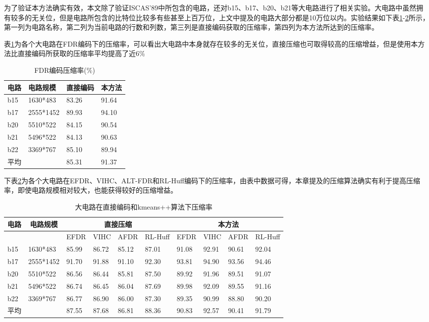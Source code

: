 为了验证本方法确实有效，本文除了验证ISCAS’89中所包含的电路，还对b15、b17、b20、b21等大电路进行了相关实验。大电路中虽然拥有较多的无关位，但是电路所包含的比特位比较多有些甚至上百万位，上文中提及的电路大部分都是10万位以内。实验结果如下表\ref{ptabl8}-\ref{ptabl9}所示，第一列为电路名称，第二列为当前电路的行数和列数，第三列是直接编码获取的压缩率，第四列为本方法所达到的压缩率。

表\ref{ptabl8}为各个大电路在FDR编码下的压缩率，可以看出大电路中本身就存在较多的无关位，直接压缩也可取得较高的压缩增益，但是使用本方法比直接编码所获取的压缩率平均提高了近6\%

\begin{table}[H]
\centering
\caption{FDR编码压缩率(\%)}\label{ptabl8}
\begin{tabular}{p{2.2cm}<{\centering}p{5cm}<{\centering}p{3cm}<{\centering}p{3cm}<{\centering}}
\toprule
\textbf{电路}&	\textbf{电路规模}& \textbf{直接编码}& \textbf{本方法}\\
\midrule
b15& 1630*483&	83.26&	91.64\\
b17& 2555*1452&	89.93&	94.10\\
b20& 5510*522&	84.15&	90.54\\
b21& 5496*522&	84.13&	90.63\\
b22& 3369*767&	85.10&	89.94\\
平均&	&   85.31&  91.37\\
\bottomrule
\end{tabular}
\end{table}

下表\ref{ptabl9}为各个大电路在EFDR、VIHC、ALT-FDR和RL-Huff编码下的压缩率，由表中数据可得，本章提及的压缩算法确实有利于提高压缩率，即使电路规模相对较大，也能获得较好的压缩增益。

\begin{table}[H]
\centering
\caption{大电路在直接编码和kmeans++算法下压缩率}\label{ptabl9}
\begin{tabular}{p{1cm}p{1cm}<{\centering}p{1.2cm}<{\centering}p{1.2cm}<{\centering}
p{1.2cm}<{\centering}p{1.2cm}<{\centering}p{1.2cm}<{\centering}p{1.2cm}<{\centering}
p{1.2cm}<{\centering}p{1.2cm}<{\centering}}
\toprule
\multicolumn{1}{c}{\textbf{电路}}& \multicolumn{1}{c}{\textbf{电路规模}} &
\multicolumn{4}{c}{\textbf{直接压缩}} & \multicolumn{4}{c}{\textbf{本方法}} \\
\midrule
&  & EFDR&   VIHC&    AFDR&   RL-Huff& 	EFDR&    VIHC&    AFDR&   RL-Huff\\
\hline
b15& 1630*483&	85.99&	86.72&	85.12&	87.01&	91.08&	92.91&	90.61&	92.04\\
b17& 2555*1452&	91.70&	91.88&	91.10&	92.30&	93.81&	94.90&	93.56&	94.46\\
b20& 5510*522&	86.56&	86.44&	85.81&	87.50&	89.92&	91.96&	89.51&	91.07\\
b21& 5496*522&	86.74&	86.45&	86.04&	87.69&	89.98&	92.09&	89.55&	91.16\\
b22& 3369*767&	86.77&	86.90&	86.00&	87.30&	89.35&	90.99&	88.80&	90.20\\
平均&		 &  87.55&	87.68&	86.81&	88.36&	90.83&	92.57&	90.41&	91.79\\
\bottomrule%
\end{tabular}
\end{table}

